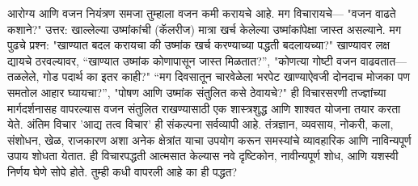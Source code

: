 आरोग्य आणि वजन नियंत्रण
समजा तुम्हाला वजन कमी करायचे आहे. मग विचारायचे— "वजन वाढते कशाने?" उत्तर: खाल्लेल्या उष्मांकांची (कॅलरीज) मात्रा खर्च केलेल्या उष्मांकांपेक्षा जास्त असल्याने. मग पुढचे प्रश्न: "खाण्यात बदल करायचा की उष्मांक खर्च करण्याच्या पद्धती बदलायच्या?" खाण्यावर लक्ष द्यायचे ठरवल्यावर, “खाण्यात उष्मांक कोणापासून जास्त मिळतात?”, "कोणत्या गोष्टी वजन वाढवतात— तळलेले, गोड पदार्थ का इतर काही?" “मग दिवसातून चारवेळेला भरपेट खाण्याऐवजी दोनदाच मोजका पण समतोल आहार घ्यायचा?”, "पोषण आणि उष्मांक संतुलित कसे ठेवायचे?" ही विचारसरणी तज्ज्ञांच्या मार्गदर्शनासह वापरल्यास वजन संतुलित राखण्यासाठी एक शास्त्रशुद्ध आणि शाश्वत योजना तयार करता येते.
अंतिम विचार
'आद्य तत्व विचार' ही संकल्पना सर्वव्यापी आहे. तंत्रज्ञान, व्यवसाय, नोकरी, कला, संशोधन, खेळ, राजकारण अशा अनेक क्षेत्रांत याचा उपयोग करून समस्यांचे व्यावहारिक आणि नाविन्यपूर्ण उपाय शोधता येतात. ही विचारपद्धती आत्मसात केल्यास नवे दृष्टिकोन, नावीन्यपूर्ण शोध, आणि यशस्वी निर्णय घेणे सोपे होते. तुम्ही कधी वापरली आहे का ही पद्धत?

